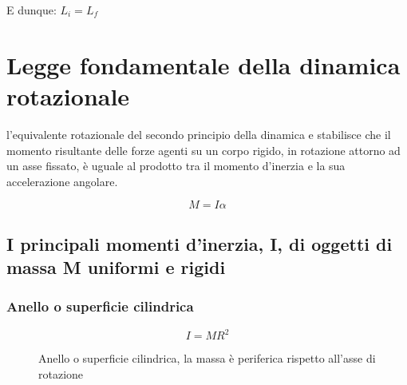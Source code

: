 E dunque: $L_{i} = L_f$


\section{Legge fondamentale della dinamica rotazionale}
\e l'equivalente rotazionale del secondo principio della dinamica e stabilisce che il momento risultante delle forze agenti su un corpo rigido, in rotazione attorno ad un asse fissato, è uguale al prodotto tra il momento d'inerzia e la sua accelerazione angolare.

\begin{equation}
    M = I\alpha
    \label{equazioneFondamentaleDinamicaRotazionale}
\end{equation}


\newpage
\subsection[I principali momenti d'inerzia]{I principali momenti d'inerzia, I, di oggetti di massa M uniformi e rigidi}


\subsubsection{Anello o superficie cilindrica}

\def\H{0.12}  %
\def\Rx{0.90} %
\def\Ry{0.35} %
\def\ang{-35} %
\begin{figure}[H]
    \centering
    \begin{minipage}[c]{0.4\textwidth}
    \centering
    \caption{Anello o superficie cilindrica, la massa è periferica rispetto all'asse di rotazione}
    \end{minipage}
    \hspace{0.1mm}
    \begin{minipage}[c]{0.4\textwidth}
    \centering
        \begin{equation}
            I = MR^2
        \end{equation}
    \end{minipage}
    \label{fig:ruotaDiBici}
\end{figure}

